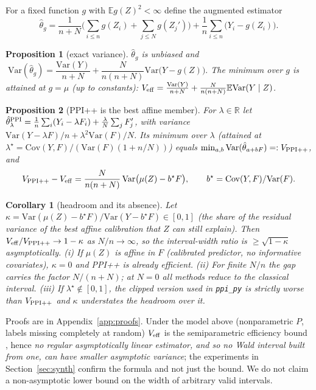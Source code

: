 \documentclass{article}
\newtheorem{proposition}{Proposition}
\newtheorem{corollary}{Corollary}
\newcommand{\E}{\mathbb{E}}
\newcommand{\Var}{\mathrm{Var}}
\newcommand{\Cov}{\mathrm{Cov}}
\begin{document}
For a fixed function $g$ with $\E g(Z)^2<\infty$ define the augmented estimator
\begin{equation}\label{eq:aug}
\hat\theta_g=\frac1{n+N}\Big(\sum_{i\le n}g(Z_i)+\sum_{j\le N}g(Z_j')\Big)+\frac1n\sum_{i\le n}\big(Y_i-g(Z_i)\big).
\end{equation}
\begin{proposition}[exact variance]\label{prop:var}
$\hat\theta_g$ is unbiased and $\;\Var(\hat\theta_g)=\dfrac{\Var(Y)}{n+N}+\dfrac{N}{n(n+N)}\Var\big(Y-g(Z)\big).$ The minimum over $g$ is attained at $g=\mu$ (up to constants): $V_{\rm eff}=\frac{\Var(Y)}{n+N}+\frac{N}{n(n+N)}\E\Var(Y\mid Z)$.
\end{proposition}
\begin{proposition}[PPI++ is the best affine member]\label{prop:ppi}
For $\lambda\in\mathbb R$ let $\hat\theta^{\rm PPI}_\lambda=\frac1n\sum_i(Y_i-\lambda F_i)+\frac\lambda N\sum_jF'_j$, with variance $\Var(Y-\lambda F)/n+\lambda^2\Var(F)/N$. Its minimum over $\lambda$ (attained at $\lambda^\star=\Cov(Y,F)/(\Var(F)(1+n/N))$) equals $\min_{a,b}\Var(\hat\theta_{a+bF})=:V_{\rm PPI++}$, and
\begin{equation}\label{eq:gap}
V_{\rm PPI++}-V_{\rm eff}=\frac{N}{n(n+N)}\,\Var\big(\mu(Z)-b^\star F\big),\qquad b^\star=\Cov(Y,F)/\Var(F).
\end{equation}
\end{proposition}
\begin{corollary}[headroom and its absence]\label{cor:head}
Let $\kappa=\Var(\mu(Z)-b^\star F)/\Var(Y-b^\star F)\in[0,1]$ (the share of the residual variance of the best affine calibration that $Z$ can still explain). Then $V_{\rm eff}/V_{\rm PPI++}\to1-\kappa$ as $N/n\to\infty$, so the interval-width ratio is $\ge\sqrt{1-\kappa}$ asymptotically. (i) If $\mu(Z)$ is affine in $F$ (calibrated predictor, no informative covariates), $\kappa=0$ and PPI++ is already efficient. (ii) For finite $N/n$ the gap carries the factor $N/(n+N)$; at $N=0$ all methods reduce to the classical interval. (iii) If $\lambda^\star\notin[0,1]$, the clipped version used in \texttt{ppi\_py} is strictly worse than $V_{\rm PPI++}$ and $\kappa$ understates the headroom over it.
\end{corollary}
Proofs are in Appendix~\ref{app:proofs}. Under the model above (nonparametric $P$, labels missing completely at random) $V_{\rm eff}$ is the semiparametric efficiency bound \citep{robins1994estimation,tsiatis2006semiparametric}, hence \emph{no regular asymptotically linear estimator, and so no Wald interval built from one, can have smaller asymptotic variance}; the experiments in Section~\ref{sec:synth} confirm the formula and not just the bound. We do not claim a non-asymptotic lower bound on the width of arbitrary valid intervals.
\end{document}
